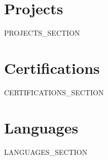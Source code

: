 \documentclass[10pt,a4paper]{article}
\begin{document}
\ifx{}\empty\else
\section{Projects}
{{PROJECTS_SECTION}}
\fi

\ifx{}\empty\else
\section{Certifications}
\small {{CERTIFICATIONS_SECTION}}
\fi

\ifx{}\empty\else
\section{Languages}
\noindent\small {{LANGUAGES_SECTION}}
\fi
\end{document}
